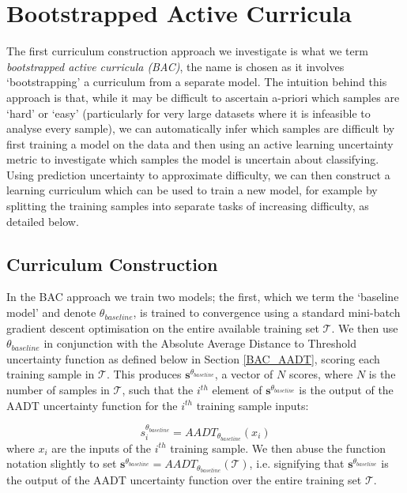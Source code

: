\chapter{Bootstrapped Active Curricula}\label{ch:BootstrappedActiveCurricula}
The first curriculum construction approach we investigate is what we term \textit{bootstrapped active curricula (BAC)}, the name is chosen as it involves `bootstrapping' a curriculum from a separate model. The intuition behind this approach is that, while it may be difficult to ascertain a-priori which samples are `hard' or `easy' (particularly for very large datasets where it is infeasible to analyse every sample), we can automatically infer which samples are difficult by first training a model on the data and then using an active learning uncertainty metric to investigate which samples the model is uncertain about classifying. Using prediction uncertainty to approximate difficulty, we can then construct a learning curriculum which can be used to train a new model, for example by splitting the training samples into separate tasks of increasing difficulty, as detailed below.
\section{Curriculum Construction}
In the BAC approach we train two models; the first, which we term the `baseline model' and denote  $\theta_{baseline}$, is trained to convergence using a standard mini-batch gradient descent optimisation on the entire available training set $\mathcal{T}$. We then use $\theta_{baseline}$ in conjunction with the Absolute Average Distance to Threshold uncertainty function as defined below in Section \ref{BAC_AADT}, scoring each training sample in $\mathcal{T}$. This produces $\mathbf{s}^{\theta_{baseline}}$, a vector of $N$ scores, where $N$ is the number of samples in $\mathcal{T}$, such that the $i^{th}$ element of $\mathbf{s}^{\theta_{baseline}}$ is the output of the AADT uncertainty function for the $i^{th}$ training sample inputs:

\begin{equation}\label{eq:BAC_S}
s^{\theta_{baseline}}_i = AADT_{\theta_{baseline}}(x_i) 
\end{equation}
where $x_i$ are the inputs of the $i^{th}$ training sample. We then abuse the function notation slightly to set $\mathbf{s}^{\theta_{baseline}} = AADT_{\theta_{baseline}}(\mathcal{T}) $, i.e. signifying that $\mathbf{s}^{\theta_{baseline}} $ is the output of the AADT uncertainty function over the entire training set $\mathcal{T}$.

